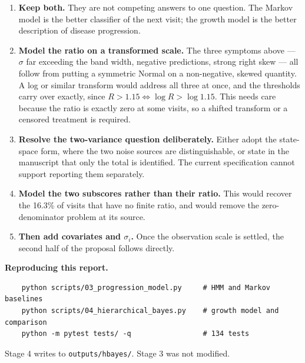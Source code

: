 \documentclass[11pt,a4paper]{article}
\newcommand{\code}[1]{\texttt{\small #1}}
\begin{document}
\begin{enumerate}
  \item \textbf{Keep both.} They are not competing answers to one question. The
        Markov model is the better classifier of the next visit; the growth
        model is the better description of disease progression.

  \item \textbf{Model the ratio on a transformed scale.} The three symptoms
        above --- $\sigma$ far exceeding the band width, negative predictions,
        strong right skew --- all follow from putting a symmetric Normal on a
        non-negative, skewed quantity. A log or similar transform would address
        all three at once, and the thresholds carry over exactly, since
        $R > 1.15 \iff \log R > \log 1.15$. This needs care because the ratio is
        exactly zero at some visits, so a shifted transform or a censored
        treatment is required.

  \item \textbf{Resolve the two-variance question deliberately.} Either adopt
        the state-space form, where the two noise sources are distinguishable,
        or state in the manuscript that only the total is identified. The
        current specification cannot support reporting them separately.

  \item \textbf{Model the two subscores rather than their ratio.} This would
        recover the 16.3\% of visits that have no finite ratio, and would remove
        the zero-denominator problem at its source.

  \item \textbf{Then add covariates and $\sigma_i$.} Once the observation scale
        is settled, the second half of the proposal follows directly.
\end{enumerate}

\vspace{0.8em}
\noindent\textbf{Reproducing this report.}
\begin{verbatim}
    python scripts/03_progression_model.py     # HMM and Markov baselines
    python scripts/04_hierarchical_bayes.py    # growth model and comparison
    python -m pytest tests/ -q                 # 134 tests
\end{verbatim}
\noindent
Stage 4 writes to \code{outputs/hbayes/}. Stage 3 was not modified.
\end{document}
